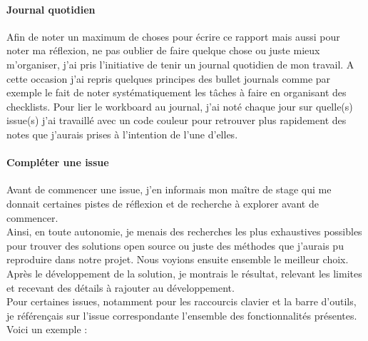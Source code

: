 \documentclass[12pt]{article}
\begin{document}
\paragraph{Journal quotidien}
Afin de noter un maximum de choses pour écrire ce rapport mais aussi pour noter ma réflexion, ne pas oublier de faire quelque chose ou juste mieux m'organiser, j'ai pris l'initiative de tenir un journal quotidien de mon travail. A cette occasion j'ai repris quelques principes des bullet journals comme par exemple le fait de noter systématiquement les tâches à faire en organisant des checklists. Pour lier le workboard au journal, j'ai noté chaque jour sur quelle(s) issue(s) j'ai travaillé avec un code couleur pour retrouver plus rapidement des notes que j'aurais prises à l'intention de l'une d'elles.

\paragraph{Compléter une issue}
Avant de commencer une issue, j'en informais mon maître de stage qui me donnait certaines pistes de réflexion et de recherche à explorer avant de commencer.\\
Ainsi, en toute autonomie, je menais des recherches les plus exhaustives possibles pour trouver des solutions open source ou juste des méthodes que j'aurais pu reproduire dans notre projet. Nous voyions ensuite ensemble le meilleur choix.\\
Après le développement de la solution, je montrais le résultat, relevant les limites et recevant des détails à rajouter au développement.\\
Pour certaines issues, notamment pour les raccourcis clavier et la barre d'outils, je référençais sur l'issue correspondante l'ensemble des fonctionnalités présentes. Voici un exemple :
\end{document}
